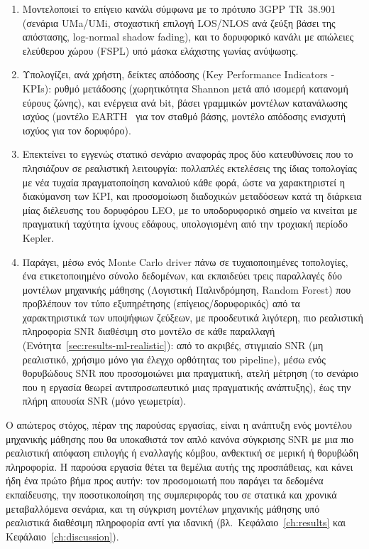 \begin{enumerate}
  \item Μοντελοποιεί το επίγειο κανάλι σύμφωνα με το πρότυπο 3GPP
    TR~38.901~\cite{tr38901} (σενάρια UMa/UMi, στοχαστική επιλογή
    LOS/NLOS ανά ζεύξη βάσει της απόστασης, log-normal shadow fading), και
    το δορυφορικό κανάλι με απώλειες ελεύθερου χώρου (FSPL) υπό μάσκα
    ελάχιστης γωνίας ανύψωσης.
  \item Υπολογίζει, ανά χρήστη, δείκτες απόδοσης (Key Performance
    Indicators - KPIs): ρυθμό μετάδοσης (χωρητικότητα Shannon μετά από
    ισομερή κατανομή εύρους ζώνης), και ενέργεια ανά bit, βάσει γραμμικών
    μοντέλων κατανάλωσης ισχύος (μοντέλο EARTH~\cite{auer2011earth} για
    τον σταθμό βάσης, μοντέλο απόδοσης ενισχυτή ισχύος για τον δορυφόρο).
  \item Επεκτείνει το εγγενώς στατικό σενάριο αναφοράς προς δύο
    κατευθύνσεις που το πλησιάζουν σε ρεαλιστική λειτουργία: πολλαπλές
    εκτελέσεις της ίδιας τοπολογίας με νέα τυχαία πραγματοποίηση καναλιού
    κάθε φορά, ώστε να χαρακτηριστεί η διακύμανση των KPI, και προσομοίωση
    διαδοχικών μεταδόσεων κατά τη διάρκεια μίας διέλευσης του δορυφόρου LEO,
    με το υποδορυφορικό σημείο να κινείται με πραγματική ταχύτητα ίχνους
    εδάφους, υπολογισμένη από την τροχιακή περίοδο Kepler.
  \item Παράγει, μέσω ενός Monte Carlo driver πάνω σε τυχαιοποιημένες
    τοπολογίες, ένα ετικετοποιημένο σύνολο δεδομένων, και εκπαιδεύει τρεις
    παραλλαγές δύο μοντέλων μηχανικής μάθησης (Λογιστική Παλινδρόμηση,
    Random Forest) που προβλέπουν τον τύπο εξυπηρέτησης
    (επίγειος/δορυφορικός) από τα χαρακτηριστικά των υποψήφιων ζεύξεων, με
    προοδευτικά λιγότερη, πιο ρεαλιστική πληροφορία SNR διαθέσιμη στο
    μοντέλο σε κάθε παραλλαγή (Ενότητα~\ref{sec:results-ml-realistic}):
    από το ακριβές, στιγμιαίο SNR (μη ρεαλιστικό, χρήσιμο μόνο για έλεγχο
    ορθότητας του pipeline), μέσω ενός θορυβώδους SNR που προσομοιώνει
    μια πραγματική, ατελή μέτρηση (το σενάριο που η εργασία θεωρεί
    αντιπροσωπευτικό μιας πραγματικής ανάπτυξης), έως την πλήρη απουσία
    SNR (μόνο γεωμετρία).
\end{enumerate}

Ο απώτερος στόχος, πέραν της παρούσας εργασίας, είναι η ανάπτυξη ενός
μοντέλου μηχανικής μάθησης που θα υποκαθιστά τον απλό κανόνα σύγκρισης
SNR με μια πιο ρεαλιστική απόφαση επιλογής ή εναλλαγής κόμβου, ανθεκτική
σε μερική ή θορυβώδη πληροφορία. Η παρούσα εργασία θέτει τα θεμέλια
αυτής της προσπάθειας, και κάνει ήδη ένα πρώτο βήμα προς αυτήν: τον
προσομοιωτή που παράγει τα δεδομένα εκπαίδευσης, την ποσοτικοποίηση της
συμπεριφοράς του σε στατικά και χρονικά μεταβαλλόμενα σενάρια, και τη
σύγκριση μοντέλων μηχανικής μάθησης υπό ρεαλιστικά διαθέσιμη πληροφορία
αντί για ιδανική (βλ.~Κεφάλαιο~\ref{ch:results} και
Κεφάλαιο~\ref{ch:discussion}).

